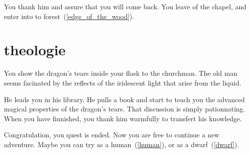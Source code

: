 You thank him and assure that you will come back. You leave of the chapel, and
enter into to forest~(\ref{edge_of_the_wood}).

\section{theologie}

You show the dragon's tears inside your flask to the churchman. The old man seems
facinated by the reflects of the iridescent light that arise from the liquid.

He leads you in his library. He pulls a book and start to teach you the advanced
magical properties of the dragon's tears. That discussion is simply
pationnating. When you have finnished, you thank him warmfully to transfert his
knowledge.

Congratulation, you quest is ended. Now you are free to continue a new
adventure. Maybe you can try as a human~(\ref{human}), or as a
dwarf~(\ref{dwarf}).
